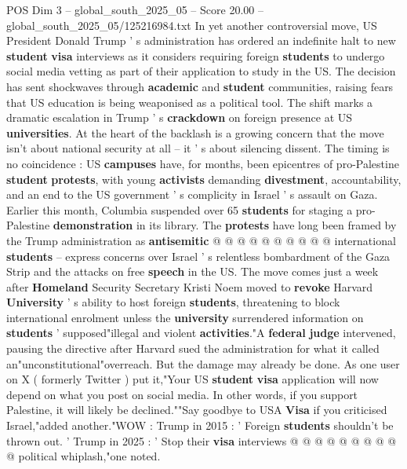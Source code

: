 \begin{textsample}{POS Dim 3 – global\_south\_2025\_05 – Score 20.00 – global\_south\_2025\_05/125216984.txt}  \label{ex:f3_pos_235}
In yet another controversial move, US President Donald Trump ' s administration has ordered an indefinite halt to new \textbf{student} \textbf{visa} interviews as it considers requiring foreign \textbf{students} to undergo social media vetting as part of their application to study in the US.
The decision has sent shockwaves through \textbf{academic} and \textbf{student} communities, raising fears that US education is being weaponised as a political tool.
The shift marks a dramatic escalation in Trump ' s \textbf{crackdown} on foreign presence at US \textbf{universities}.
At the heart of the backlash is a growing concern that the move isn't about national security at all -- it ' s about silencing dissent.
The timing is no coincidence : US \textbf{campuses} have, for months, been epicentres of pro-Palestine \textbf{student} \textbf{protests}, with young \textbf{activists} demanding \textbf{divestment}, accountability, and an end to the US government ' s complicity in Israel ' s assault on Gaza.
Earlier this month, Columbia suspended over 65 \textbf{students} for staging a pro-Palestine \textbf{demonstration} in its library.
The \textbf{protests} have long been framed by the Trump administration as \textbf{antisemitic} @ @ @ @ @ @ @ @ @ @ international \textbf{students} -- express concerns over Israel ' s relentless bombardment of the Gaza Strip and the attacks on free \textbf{speech} in the US.
The move comes just a week after \textbf{Homeland} Security Secretary Kristi Noem moved to \textbf{revoke} Harvard \textbf{University} ' s ability to host foreign \textbf{students}, threatening to block international enrolment unless the \textbf{university} surrendered information on \textbf{students} ' supposed"illegal and violent \textbf{activities}."A \textbf{federal} \textbf{judge} intervened, pausing the directive after Harvard sued the administration for what it called an"unconstitutional"overreach.
But the damage may already be done.
As one user on X ( formerly Twitter ) put it,"Your US \textbf{student} \textbf{visa} application will now depend on what you post on social media.
In other words, if you support Palestine, it will likely be declined.""Say goodbye to USA \textbf{Visa} if you criticised Israel,"added another."WOW : Trump in 2015 : ' Foreign \textbf{students} shouldn't be thrown out. ' Trump in 2025 : ' Stop their \textbf{visa} interviews @ @ @ @ @ @ @ @ @ @ political whiplash,"one noted.

\end{textsample}
